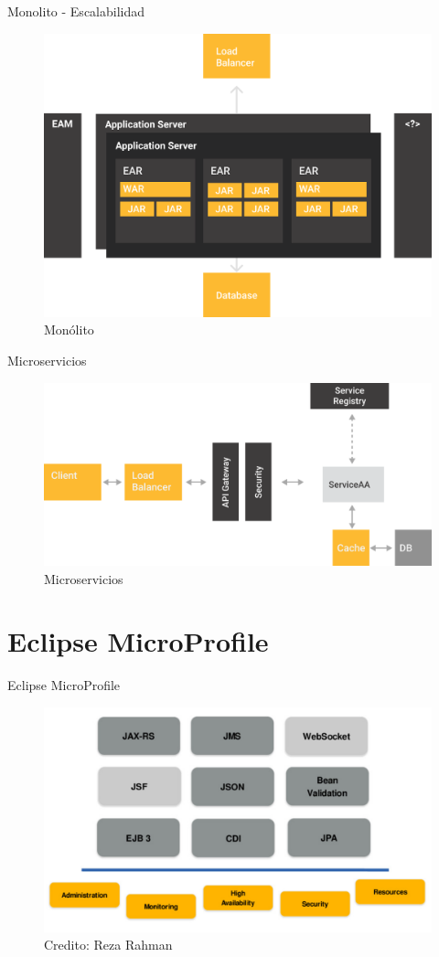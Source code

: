 \documentclass{beamer}
\begin{document}
\begin{frame}{Monolito - Escalabilidad}
\begin{figure}
	\centering
	\includegraphics[width=0.7\linewidth]{Images/monolitos}
	\caption{Monólito}
\end{figure}
\end{frame}


\begin{frame}{Microservicios}
\begin{figure}
\centering
\includegraphics[width=\linewidth]{Images/microservicios}
\caption{Microservicios}
\end{figure}
\end{frame}


\section{Eclipse MicroProfile}

\begin{frame}{Eclipse MicroProfile}
\begin{figure}
	\centering
	\includegraphics[width=\linewidth]{Images/javaeemicropancake}
	\caption{Credito: Reza Rahman}
\end{figure}
\end{frame}
\end{document}
